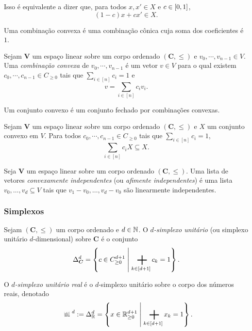 Isso é equivalente a dizer que, para todos $x,x' \in X$ e $c \in \left[{0},{1}\right]$,
	\begin{equation*}
	(1-c)x + cx' \in X.
	\end{equation*}

Uma combinação convexa é uma combinação cônica cuja soma dos coeficientes é $1$.

\begin{definition}
Sejam $\bm V$ um espaço linear sobre um corpo ordenado $(\bm C,\leq)$ e $v_0,\cdots,v_{n-1} \in V$. Uma \emph{combinação convexa} de $v_0,\cdots,v_{n-1}$ é um vetor $v \in V$ para o qual existem $c_0,\cdots,c_{n-1} \in C_{\geq 0}$ tais que $\sum_{i \in [n]} c_i = 1$ e
	\begin{equation*}
	v = \sum_{i \in [n]} c_iv_i.
	\end{equation*}
\end{definition}

Um conjunto convexo é um conjunto fechado por combinações convexas.

\begin{proposition}
Sejam $\bm V$ um espaço linear sobre um corpo ordenado $(\bm C,\leq)$ e $X$ um conjunto convexo em $V$. Para todos $c_0,\cdots,c_{n-1} \in C_{\geq 0}$ tais que $\sum_{i \in [n]} c_i = 1$,
	\begin{equation*}
	\sum_{i \in [n]} c_iX \subseteq X.
	\end{equation*}
\end{proposition}

\begin{definition}
Seja $\bm V$ um espaço linear sobre um corpo ordenado $(\bm C,\leq)$. Uma lista de vetores \emph{convexamente independentes} (ou \emph{afimente independentes}) é uma lista $v_0, \ldots, v_d \subseteq V$ tais que $v_1-v_0, \ldots, v_d-v_0$ são linearmente independentes.
\end{definition}

\subsubsection{Simplexos}

\begin{definition}
Sejam $(\bm C,\leq)$ um corpo ordenado e $d \in \mathbb{N}$. O \emph{$d$-simplexo unitário} (ou simplexo unitário $d$-dimensional) sobre $\bm C$ é o conjunto
	\begin{equation*}
	\simp^d_{\bm C} = \set{c \in C_{\geq 0}^{d+1}}{\sum_{k \in [d+1]} c_k = 1}.
	\end{equation*}

O \emph{$d$-simplexo unitário real} é o $d$-simplexo unitário sobre o corpo dos números reais, denotado
	\begin{equation*}
	\Sx^d := \simp^d_{\R} = \set{x \in \R_{\geq 0}^{d+1}}{\sum_{k \in [d+1]} x_k = 1}.
	\end{equation*}
\end{definition}

